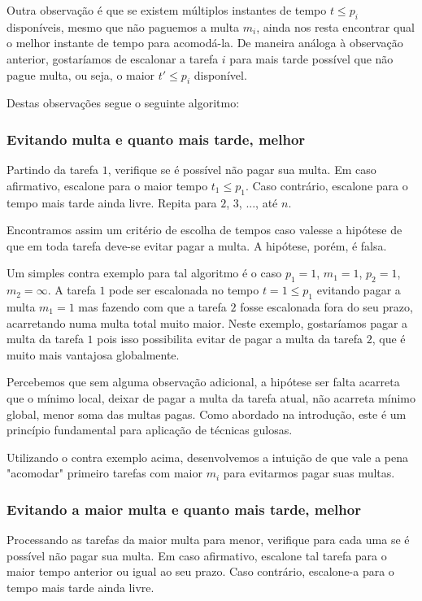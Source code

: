 Outra observação é que se existem múltiplos instantes de tempo $t \leq p_i$ disponíveis, mesmo que não paguemos a multa $m_i$, ainda nos resta encontrar qual o melhor instante de tempo para acomodá-la. De maneira análoga à observação anterior, gostaríamos de escalonar a tarefa $i$ para mais tarde possível que não pague multa, ou seja, o maior $t' \leq p_i$ disponível.

Destas observações segue o seguinte algoritmo:

\subsubsection*{Evitando multa e quanto mais tarde, melhor}

Partindo da tarefa $1$, verifique se é possível não pagar sua multa. Em caso afirmativo, escalone para o maior tempo $t_1 \leq p_1$. Caso contrário, escalone para o tempo mais tarde ainda livre. Repita para $2$, $3$, ..., até $n$.

Encontramos assim um critério de escolha de tempos caso valesse a hipótese de que em toda tarefa deve-se evitar pagar a multa. A hipótese, porém, é falsa.

Um simples contra exemplo para tal algoritmo é o caso $p_1 = 1$, $m_1 = 1$, $p_2 = 1$, $m_2 = \infty$. A tarefa $1$ pode ser escalonada no tempo $t = 1 \leq p_1$ evitando pagar a multa $m_1 = 1$ mas fazendo com que a tarefa $2$ fosse escalonada fora do seu prazo, acarretando numa multa total muito maior. Neste exemplo, gostaríamos pagar a multa da tarefa $1$ pois isso possibilita evitar de pagar a multa da tarefa $2$, que é muito mais vantajosa globalmente.

Percebemos que sem alguma observação adicional, a hipótese ser falta acarreta que o mínimo local, deixar de pagar a multa da tarefa atual, não acarreta mínimo global, menor soma das multas pagas. Como abordado na introdução, este é um princípio fundamental para aplicação de técnicas gulosas.

Utilizando o contra exemplo acima, desenvolvemos a intuição de que vale a pena "acomodar" primeiro tarefas com maior $m_i$ para evitarmos pagar suas multas.

\subsubsection*{Evitando a maior multa e quanto mais tarde, melhor}

Processando as tarefas da maior multa para menor, verifique para cada uma se é possível não pagar sua multa. Em caso afirmativo, escalone tal tarefa para o maior tempo anterior ou igual ao seu prazo. Caso contrário, escalone-a para o tempo mais tarde ainda livre.

